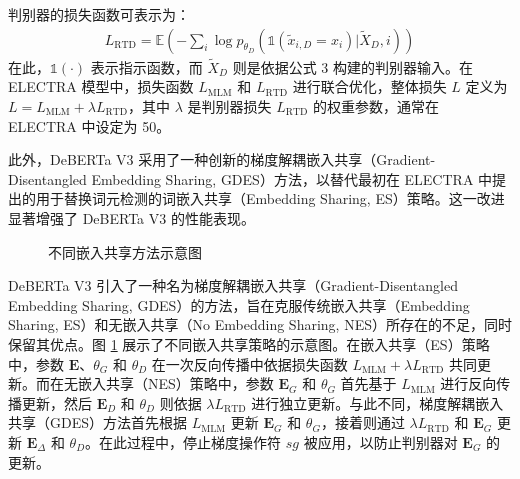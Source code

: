 判别器的损失函数可表示为：
\begin{align}
L_{\text{RTD}} = \mathbb{E} \left( - \sum_{i} \log p_{\theta_D} \left( \mathbb{1}(\tilde{x}_{i,D} = x_i)|\tilde{X}_D, i \right) \right) 
\end{align}
在此，\(\mathbb{1}(\cdot)\) 表示指示函数，而 \(\tilde{X}_D\) 则是依据公式 3 构建的判别器输入。在 ELECTRA 模型中，损失函数 \(L_{\text{MLM}}\) 和 \(L_{\text{RTD}}\) 进行联合优化，整体损失 \(L\) 定义为 \(L = L_{\text{MLM}} + \lambda L_{\text{RTD}}\)，其中 \(\lambda\) 是判别器损失 \(L_{\text{RTD}}\) 的权重参数，通常在 ELECTRA 中设定为 50。

此外，DeBERTa V3 采用了一种创新的梯度解耦嵌入共享（Gradient-Disentangled Embedding Sharing, GDES）方法，以替代最初在 ELECTRA 中提出的用于替换词元检测的词嵌入共享（Embedding Sharing, ES）策略。这一改进显著增强了 DeBERTa V3 的性能表现。

\begin{figure}[htbp]
\centering  
{}
\hfill
{}
\hfill
{}
\caption{不同嵌入共享方法示意图 \cite{he2023debertav3improvingdebertausing}}
\label{fig:es}
\end{figure}

DeBERTa V3 引入了一种名为梯度解耦嵌入共享（Gradient-Disentangled Embedding Sharing, GDES）的方法，旨在克服传统嵌入共享（Embedding Sharing, ES）和无嵌入共享（No Embedding Sharing, NES）所存在的不足，同时保留其优点。图 \ref{fig:es} 展示了不同嵌入共享策略的示意图。在嵌入共享（ES）策略中，参数 \(\mathbf{E}\)、\(\theta_G\) 和 \(\theta_D\) 在一次反向传播中依据损失函数 \(L_{\text{MLM}} + \lambda L_{\text{RTD}}\) 共同更新。而在无嵌入共享（NES）策略中，参数 \(\mathbf{E}_G\) 和 \(\theta_G\) 首先基于 \(L_{\text{MLM}}\) 进行反向传播更新，然后 \(\mathbf{E}_D\) 和 \(\theta_D\) 则依据 \(\lambda L_{\text{RTD}}\) 进行独立更新。与此不同，梯度解耦嵌入共享（GDES）方法首先根据 \(L_{\text{MLM}}\) 更新 \(\mathbf{E}_G\) 和 \(\theta_G\)，接着则通过 \(\lambda L_{\text{RTD}}\) 和 \(\mathbf{E}_G\) 更新 \(\mathbf{E}_{\Delta}\) 和 \(\theta_D\)。在此过程中，停止梯度操作符 \(sg\) 被应用，以防止判别器对 \(\mathbf{E}_G\) 的更新。

